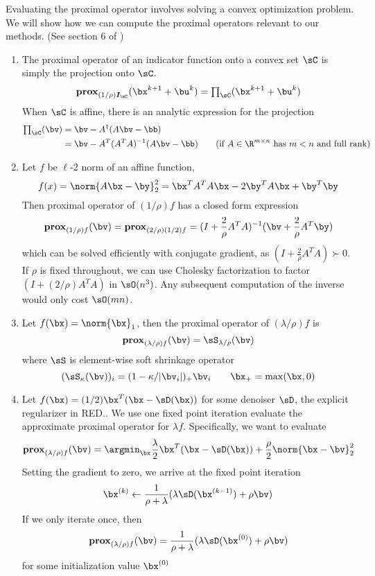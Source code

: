 \documentclass[11pt]{article}
\renewcommand{\sI}{\boldsymbol{I}}
\newcommand{\prox}{\textbf{prox}}
\begin{document}
Evaluating the proximal operator involves solving a convex optimization problem. We will show how we can compute the proximal operators relevant to our methods. (See section 6 of \cite{parikhProximalAlgorithms2014}) 
\begin{enumerate}
    \item The proximal operator of an indicator function onto a convex set $\sC$ is simply the projection onto $\sC$. 
    \[
        \prox_{(1/\rho)\sI_{\sC}}(\bx^{k+1} + \bu^k) =  \textstyle\prod_{\sC}(\bx^{k+1}+\bu^k)
    \]
    When $\sC$ is affine, there is an analytic expression for the projection
    \begin{align*}
        \textstyle\prod_{\sC}(\bv) 
            &= \bv - A^{\dagger}(A\bv-\bb)  \\
            &= \bv - A^T(A^TA)^{-1}(A\bv-\bb) \tag{if $A\in\R^{m\times n}$ has $m<n$ and full rank}
    \end{align*}
    \item Let $f$ be $\ell$-2 norm of an affine function, 
    \[
        f(x) = \norm{A\bx-\by}_2^2 = \bx^TA^TA\bx - 2\by^TA\bx + \by^T\by
    \]
    Then proximal operator of $(1/\rho)f$ has a closed form expression
    \[
        \prox_{(1/\rho)f}(\bv) 
            = \prox_{(2/\rho)(1/2)f}
            = (I + \frac{2}{\rho}A^TA)^{-1} (\bv + \frac{2}{\rho}A^T \by)
    \]
    which can be solved efficiently with conjugate gradient, as $(I + \frac{2}{\rho} A^TA) \succ 0$. If $\rho$ is fixed throughout, we can use Cholesky factorization to factor $(I + (2/\rho)A^TA)$ in $\sO(n^3)$. Any subsequent computation of the inverse would only cost $\sO(mn)$.
    \item Let $f(\bx) = \norm{\bx}_1$, then the proximal operator of $(\lambda/\rho) f$ is
    \[
        \prox_{(\lambda/\rho)f}(\bv) 
            = \sS_{\lambda/\rho}(\bv)
    \]
    where $\sS$ is element-wise soft shrinkage operator
    \[
        (\sS_{\kappa}(\bv))_i
            = (1-\kappa/|\bv_i|)_{+}\bv_i
        \quad\quad
        \bx_{+} = \max(\bx,0)
    \]
    \item Let $f(\bx) = (1/2)\bx^T(\bx-\sD(\bx))$ for some denoiser $\sD$, the explicit regularizer in RED.\cite{romanoLittleEngineThat2016}. We use one fixed point iteration evaluate the approximate proximal operator for $\lambda f$. Specifically, we want to evaluate 
    \[
        \prox_{(\lambda/\rho)f} (\bv)
            = \argmin_{\bx} \frac{\lambda}{2}\bx^T(\bx-\sD(\bx)) + \frac{\rho}{2} \norm{\bx-\bv}_2^2
    \]
    Setting the gradient to zero, we arrive at the fixed point iteration
    \[
        \bx^{(k)} \leftarrow \frac{1}{\rho+\lambda}(
            \lambda \sD(\bx^{(k-1)}) + \rho \bv
        )
    \]
    If we only iterate once, then 
    \[
        \prox_{(\lambda/\rho)f} (\bv)
            = \frac{1}{\rho+\lambda}( \lambda \sD(\bx^{(0)}) + \rho \bv )
    \]
    for some initialization value $\bx^{(0)}$
\end{enumerate}
\end{document}
